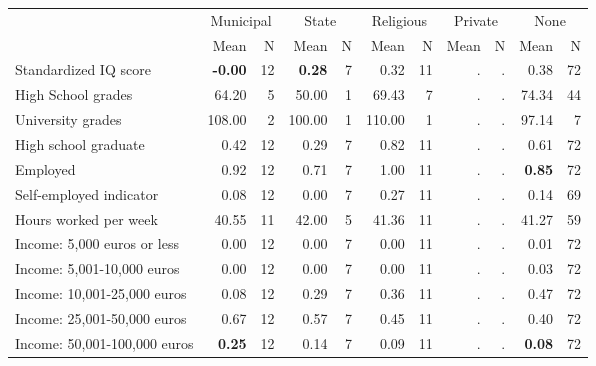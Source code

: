 \begin{tabular}{l r r r r r r r r r r}
\toprule
& \multicolumn{2}{c}{Municipal} & \multicolumn{2}{c}{State} & \multicolumn{2}{c}{Religious} & \multicolumn{2}{c}{Private} & \multicolumn{2}{c}{None} \\
& \scriptsize Mean & \scriptsize N & \scriptsize Mean & \scriptsize N & \scriptsize Mean & \scriptsize N & \scriptsize Mean & \scriptsize N & \scriptsize Mean & \scriptsize N \\
\midrule
Standardized IQ score & \textbf{    -0.00} &        12 & \textbf{     0.28} &         7 &      0.32 &        11 &         . & . &      0.38 &        72 \\
High School grades &     64.20 &         5 &     50.00 &         1 &     69.43 &         7 &         . & . &     74.34 &        44 \\
University grades &    108.00 &         2 &    100.00 &         1 &    110.00 &         1 &         . & . &     97.14 &         7 \\
High school graduate &      0.42 &        12 &      0.29 &         7 &      0.82 &        11 &         . & . &      0.61 &        72 \\
Employed &      0.92 &        12 &      0.71 &         7 &      1.00 &        11 &         . & . & \textbf{     0.85} &        72 \\
Self-employed indicator &      0.08 &        12 &      0.00 &         7 &      0.27 &        11 &         . & . &      0.14 &        69 \\
Hours worked per week &     40.55 &        11 &     42.00 &         5 &     41.36 &        11 &         . & . &     41.27 &        59 \\
Income: 5,000 euros or less &      0.00 &        12 &      0.00 &         7 &      0.00 &        11 &         . & . &      0.01 &        72 \\
Income: 5,001-10,000 euros &      0.00 &        12 &      0.00 &         7 &      0.00 &        11 &         . & . &      0.03 &        72 \\
Income: 10,001-25,000 euros &      0.08 &        12 &      0.29 &         7 &      0.36 &        11 &         . & . &      0.47 &        72 \\
Income: 25,001-50,000 euros &      0.67 &        12 &      0.57 &         7 &      0.45 &        11 &         . & . &      0.40 &        72 \\
Income: 50,001-100,000 euros & \textbf{     0.25} &        12 &      0.14 &         7 &      0.09 &        11 &         . & . & \textbf{     0.08} &        72 \\

\end{tabular}
